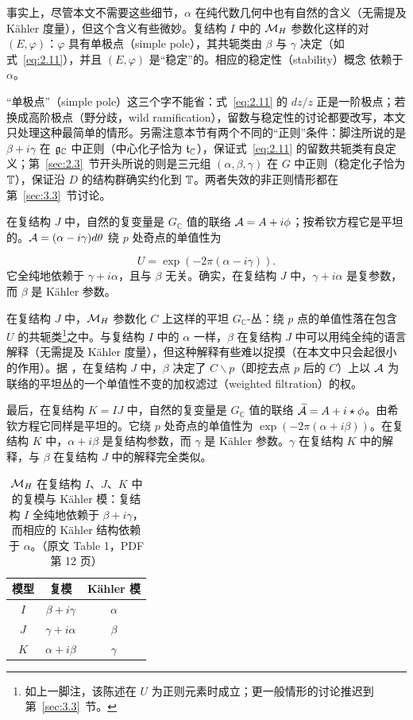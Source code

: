 事实上，尽管本文不需要这些细节，$\alpha$ 在纯代数几何中也有自然的含义（无需提及 Kähler 度量），但这个含义有些微妙。复结构 $I$ 中的 ${{\mathcal{M}}_H}$ 参数化这样的对 $(E,\varphi)$：$\varphi$ 具有单极点（simple pole），其共轭类由 $\beta$ 与 $\gamma$ 决定（如式~\eqref{eq:2.11}），并且 $(E,\varphi)$ 是“稳定”的。相应的稳定性（stability）概念 \cite{ref22} 依赖于 $\alpha$。

\begin{yizhu}[易错点]
“单极点”（simple pole）这三个字不能省：式~\eqref{eq:2.11} 的 $dz/z$ 正是一阶极点；若换成高阶极点（野分歧，wild ramification），留数与稳定性的讨论都要改写，本文只处理这种最简单的情形。另需注意本节有两个不同的“正则”条件：脚注所说的是 $\beta+i\gamma$ 在 $\mathfrak g_{\mathbb{C}}$ 中正则（中心化子恰为 $\mathfrak t_{\mathbb{C}}$），保证式~\eqref{eq:2.11} 的留数共轭类有良定义；第~\ref{sec:2.3}~节开头所说的则是三元组 $(\alpha,\beta,\gamma)$ 在 $G$ 中正则（稳定化子恰为 ${\mathbb{T}}$），保证沿 $D$ 的结构群确实约化到 ${\mathbb{T}}$。两者失效的非正则情形都在第~\ref{sec:3.3}~节讨论。
\end{yizhu}

在复结构 $J$ 中，自然的复变量是 $G_{\mathbb{C}}$ 值的联络 ${\mathcal A}=A+i\phi$；按希钦方程它是平坦的。${\mathcal A}=(\alpha-i\gamma)d\theta$ 绕 $p$ 处奇点的单值性为

\setcounter{equation}{11}
\begin{equation}\label{eq:2.12}
  U=\exp(-2\pi(\alpha-i\gamma)).
\end{equation}
 它全纯地依赖于 $\gamma+i\alpha$，且与 $\beta$ 无关。确实，在复结构 $J$ 中，$\gamma+i\alpha$ 是复参数，而 $\beta$ 是 Kähler 参数。

在复结构 $J$ 中，${{\mathcal{M}}_H}$ 参数化 $C$ 上这样的平坦 $G_{\mathbb{C}}$-丛：绕 $p$ 点的单值性落在包含 $U$ 的共轭类\footnote{如上一脚注，该陈述在 $U$ 为正则元素时成立；更一般情形的讨论推迟到第~\ref{sec:3.3}~节。}之中。与复结构 $I$ 中的 $\alpha$ 一样，$\beta$ 在复结构 $J$ 中可以用纯全纯的语言解释（无需提及 Kähler 度量），但这种解释有些难以捉摸（在本文中只会起很小的作用）。据 \cite{ref22}，在复结构 $J$ 中，$\beta$ 决定了 $C\backslash p$（即挖去点 $p$ 后的 $C$）上以 ${\mathcal A}$ 为联络的平坦丛的一个单值性不变的加权滤过（weighted filtration）的权。

最后，在复结构 $K=IJ$ 中，自然的复变量是 $G_{\mathbb{C}}$ 值的联络 $\widetilde{{\mathcal A}}=A+i\star
\phi$。由希钦方程它同样是平坦的。它绕 $p$ 处奇点的单值性为 $\exp(-2\pi(\alpha+i\beta))$。在复结构 $K$ 中，$\alpha+i\beta$ 是复结构参数，而 $\gamma$ 是 Kähler 参数。$\gamma$ 在复结构 $K$ 中的解释，与 $\beta$ 在复结构 $J$ 中的解释完全类似。
\begin{table}[htbp]
  \centering
  \begin{tabular}{c|c|c}
    \hline
    模型 & 复模 & K\"ahler 模 \\
    \hline
    $I$ & $\beta+i\gamma$ & $\alpha$ \\
    $J$ & $\gamma+i\alpha$ & $\beta$ \\
    $K$ & $\alpha+i\beta$ & $\gamma$ \\
    \hline
  \end{tabular}
  \caption{${{\mathcal{M}}_H}$ 在复结构 $I$、$J$、$K$ 中的复模与 K\"ahler 模：复结构 $I$ 全纯地依赖于 $\beta+i\gamma$，而相应的 K\"ahler 结构依赖于 $\alpha$。（原文 Table 1，PDF 第 12 页）}
  \label{tab:1}
\end{table}

